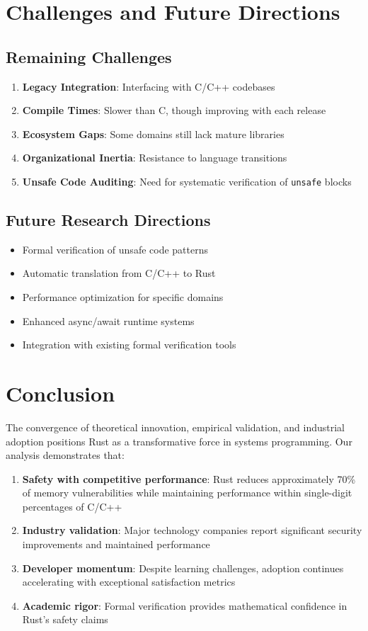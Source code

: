 \documentclass[11pt]{article}
\begin{document}
\section{Challenges and Future Directions}

\subsection{Remaining Challenges}
\begin{enumerate}
    \item \textbf{Legacy Integration}: Interfacing with C/C++ codebases
    \item \textbf{Compile Times}: Slower than C, though improving with each release
    \item \textbf{Ecosystem Gaps}: Some domains still lack mature libraries
    \item \textbf{Organizational Inertia}: Resistance to language transitions
    \item \textbf{Unsafe Code Auditing}: Need for systematic verification of \texttt{unsafe} blocks
\end{enumerate}

\subsection{Future Research Directions}
\begin{itemize}
    \item Formal verification of unsafe code patterns
    \item Automatic translation from C/C++ to Rust
    \item Performance optimization for specific domains
    \item Enhanced async/await runtime systems
    \item Integration with existing formal verification tools
\end{itemize}

\section{Conclusion}

The convergence of theoretical innovation, empirical validation, and industrial adoption positions Rust as a transformative force in systems programming. Our analysis demonstrates that:

\begin{enumerate}
    \item \textbf{Safety with competitive performance}: Rust reduces approximately 70\% of memory vulnerabilities while maintaining performance within single-digit percentages of C/C++
    \item \textbf{Industry validation}: Major technology companies report significant security improvements and maintained performance
    \item \textbf{Developer momentum}: Despite learning challenges, adoption continues accelerating with exceptional satisfaction metrics
    \item \textbf{Academic rigor}: Formal verification provides mathematical confidence in Rust's safety claims
\end{enumerate}
\end{document}
